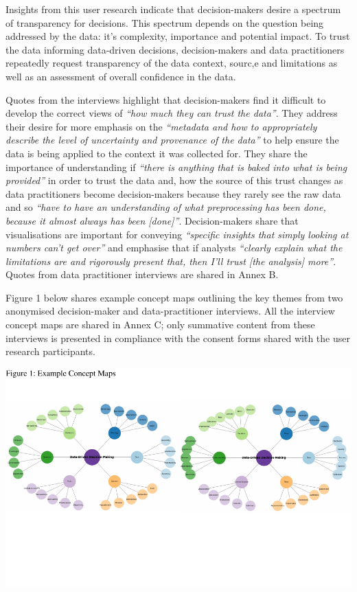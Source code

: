 \documentclass{article}
\begin{document}
Insights from this user research indicate that decision-makers desire a
spectrum of transparency for decisions. This spectrum depends on the
question being addressed by the data: it's complexity, importance and
potential impact. To trust the data informing data-driven decisions,
decision-makers and data practitioners repeatedly request transparency
of the data context, sourc,e and limitations as well as an assessment of
overall confidence in the data.

Quotes from the interviews highlight that decision-makers find it
difficult to develop the correct views of \emph{``how much they can
trust the data''}. They address their desire for more emphasis on the
\emph{``metadata and how to appropriately describe the level of
uncertainty and provenance of the data''} to help ensure the data is
being applied to the context it was collected for. They share the
importance of understanding if \emph{``there is anything that is baked
into what is being provided''} in order to trust the data and, how the
source of this trust changes as data practitioners become
decision-makers because they rarely see the raw data and so \emph{``have
to have an understanding of what preprocessing has been done, because it
almost always has been {[}done{]}''}. Decision-makers share that
visualisations are important for conveying \emph{``specific insights
that simply looking at numbers can't get over''} and emphasise that if
analysts \emph{``clearly explain what the limitations are and rigorously
present that, then I'll trust {[}the analysis{]} more''}. Quotes from
data practitioner interviews are shared in Annex B.

Figure 1 below shares example concept maps outlining the key themes from
two anonymised decision-maker and data-practitioner interviews. All the
interview concept maps are shared in Annex C; only summative content
from these interviews is presented in compliance with the consent forms
shared with the user research participants.

\includegraphics{210431461_CSC8639_Dissertation_files/figure-latex/ConceptMapExample-1.pdf}
\vspace{-3.3cm}
\end{document}

